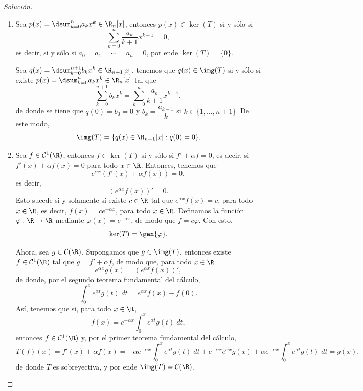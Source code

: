 \documentclass[a4,11pt]{aleph-notas}
\begin{document}
\begin{proof}[Solución]
\begin{enumerate}
    \item Sea $p(x) = \dsum_{k=0}^n a_k x^k\in \R_n[x]$, entonces $p(x)\in \ker(T)$ si y sólo si
    \[
        \sum_{k=0}^n \frac{a_k}{k+1}x^{k+1} = 0,
    \]
    es decir, si y sólo si $a_0 = a_1 = \cdots = a_n = 0$, por ende $\ker(T) = \{0\}$. 
    
    Sea $q(x) = \dsum_{k=0}^{n+1} b_k x^k\in \R_{n+1}[x]$, tenemos que $q(x)\in\img(T)$ si y sólo si existe $p(x) = \dsum_{k=0}^n a_k x^k\in \R_n[x]$ tal que
    \[
        \sum_{k=0}^{n+1} b_k x^k = \sum_{k=0}^n \frac{a_k}{k+1}x^{k+1},
    \]
    de donde se tiene que $q(0) = b_0 = 0$ y $b_k = \dfrac{a_{k-1}}{k}$ si $k\in\{1,\dots,n+1\}$. De este modo,
    \[
        \img(T) = \{q(x)\in \R_{n+1}[x] : q(0) = 0\}.
    \]
    
    \item Sea $f\in\mathcal{C}^1(\R)$, entonces $f\in\ker(T)$ si y sólo si $f'+\alpha f = 0$, es decir, si $f'(x) + \alpha f(x) = 0$ para todo $x\in \R$. Entonces, tenemos que
    \[
        e^{\alpha x}(f'(x) + \alpha f(x)) = 0,
    \]
    es decir,
    \[
        (e^{\alpha x}f(x)) ' = 0.
    \]
    Esto sucede si y solamente sí existe $c\in\R$ tal que $e^{\alpha x}f(x) = c$, para todo $x\in\R$, es decir, $f(x) = ce^{-\alpha x}$, para todo $x\in\R$. Definamos la función $\varphi:\R\to\R$ mediante $\varphi(x) = e^{-\alpha x}$, de modo que $f=c\varphi$. Con esto,
    \[
        \ker(T) = \gen\{\varphi\}.
    \]
    
    Ahora, sea $g\in\mathcal{C}(\R)$. Supongamos que $g\in\img(T)$, entonces existe $f\in\mathcal{C}^1(\R)$ tal que $g = f' + \alpha f$, de modo que, para todo $x\in\R$
    \[
        e^{\alpha x}g(x) = (e^{\alpha x}f(x))',
    \]
    de donde, por el segundo teorema fundamental del cálculo,
    \[
        \int_0^x e^{\alpha t}g(t) \; dt = e^{\alpha x}f(x) - f(0).
    \]
    Así, tenemos que si, para todo $x\in\R$,
    \[
        f(x) = e^{-\alpha x}\int_0^x e^{\alpha t}g(t) \; dt,
    \]
    entonces $f\in\mathcal{C}^1(\R)$ y, por el primer teorema fundamental del cálculo,
    \[
        T(f)(x) = f'(x) + \alpha f(x) = -\alpha e^{-\alpha x}\int_0^x e^{\alpha t}g(t) \; dt + e^{-\alpha x} e^{\alpha x}g(x) + \alpha e^{-\alpha x}\int_0^x e^{\alpha t}g(t) \; dt = g(x),
    \]
    de donde $T$ es sobreyectiva, y por ende $\img(T)=\mathcal{C}(\R)$.
\end{enumerate}
\end{proof}
\end{document}
